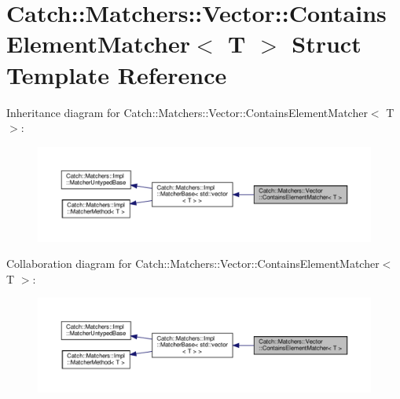 \hypertarget{structCatch_1_1Matchers_1_1Vector_1_1ContainsElementMatcher}{}\section{Catch\+::Matchers\+::Vector\+::Contains\+Element\+Matcher$<$ T $>$ Struct Template Reference}
\label{structCatch_1_1Matchers_1_1Vector_1_1ContainsElementMatcher}


Inheritance diagram for Catch\+::Matchers\+::Vector\+::Contains\+Element\+Matcher$<$ T $>$\+:\nopagebreak
\begin{figure}[H]
\begin{center}
\leavevmode
\includegraphics[width=350pt]{structCatch_1_1Matchers_1_1Vector_1_1ContainsElementMatcher__inherit__graph}
\end{center}
\end{figure}


Collaboration diagram for Catch\+::Matchers\+::Vector\+::Contains\+Element\+Matcher$<$ T $>$\+:\nopagebreak
\begin{figure}[H]
\begin{center}
\leavevmode
\includegraphics[width=350pt]{structCatch_1_1Matchers_1_1Vector_1_1ContainsElementMatcher__coll__graph}
\end{center}
\end{figure}
